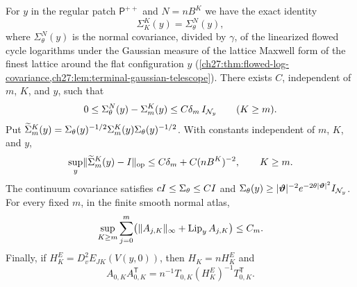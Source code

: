 \begin{theorem}\label{ch31:thm:normal-covariance-calibration}
For $y$ in the regular patch $\mathsf P^{++}$ and $N=nB^K$ we have the exact identity
\[
 \Sigma_K^K(y)=\Sigma_\theta^N(y),
\]
where $\Sigma_\theta^N(y)$ is the normal covariance, divided by $\gamma$, of the linearized flowed cycle logarithms under the Gaussian measure of the lattice Maxwell form of the finest lattice around the flat configuration $y$ (\cref{ch27:thm:flowed-log-covariance,ch27:lem:terminal-gaussian-telescope}). There exists $C$, independent of $m$, $K$, and $y$, such that
\[
 0\le\Sigma_\theta^N(y)-\Sigma_m^K(y)\le C\delta_m\,I_{\mathcal N_{y}}\qquad(K\ge m).
\]
Put $\widetilde\Sigma_m^K(y)=\Sigma_\theta(y)^{-1/2}\Sigma_m^K(y)\Sigma_\theta(y)^{-1/2}$. With constants independent of $m$, $K$, and $y$,
\begin{equation}\label{ch31:eq:finite-cutoff-covariance-error}
 \sup_y\lVert \widetilde\Sigma_m^K(y)-I\rVert_{\rm op}\le C\delta_m+C(nB^K)^{-2},\qquad K\ge m.
\end{equation}
The continuum covariance satisfies $cI\le\Sigma_\theta\le CI$ and $\Sigma_\theta(y)\ge\lvert \bm\vartheta\rvert^{-2}e^{-2\theta\lvert \bm\vartheta\rvert^2}I_{\mathcal N_{y}}$. For every fixed $m$, in the finite smooth normal atlas,
\begin{equation}\label{ch31:eq:response-c1-bounds}
 \sup_{K\ge m}\sum_{j=0}^m\bigl(\lVert A_{j,K}\rVert_\infty+\operatorname{Lip}_yA_{j,K}\bigr)\le C_m.
\end{equation}
Finally, if $H_K^E=D_v^2E_{JK}(V(y,0))$, then $H_K=nH_K^E$ and
\[
 A_{0,K}A_{0,K}^{\mathsf T}=n^{-1}T_{0,K}(H_K^E)^{-1}T_{0,K}^{\mathsf T}.
\]
\end{theorem}

